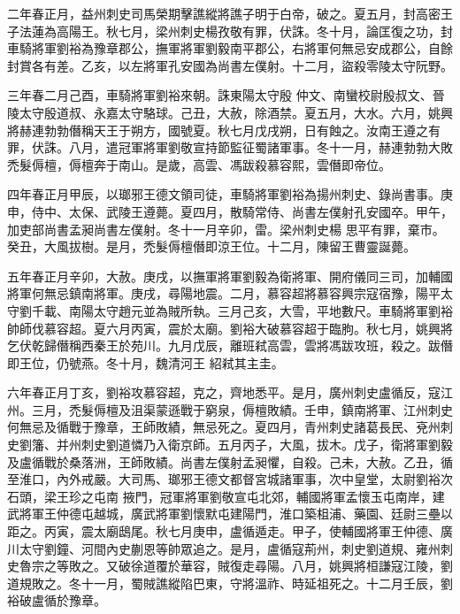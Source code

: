 \begin{pinyinscope}
 二年春正月，益州刺史司馬榮期擊譙縱將譙子明于白帝，破之。夏五月，封高密王子法蓮為高陽王。秋七月，梁州刺史楊孜敬有罪，伏誅。冬十月，論匡復之功，封車騎將軍劉裕為豫章郡公，撫軍將軍劉毅南平郡公，右將軍何無忌安成郡公，自餘封賞各有差。乙亥，以左將軍孔安國為尚書左僕射。十二月，盜殺零陵太守阮野。



 三年春二月己酉，車騎將軍劉裕來朝。誅東陽太守殷
 仲文、南蠻校尉殷叔文、晉陵太守殷道叔、永嘉太守駱球。己丑，大赦，除酒禁。夏五月，大水。六月，姚興將赫連勃勃僭稱天王于朔方，國號夏。秋七月戊戌朔，日有蝕之。汝南王遵之有罪，伏誅。八月，遣冠軍將軍劉敬宣持節監征蜀諸軍事。冬十一月，赫連勃勃大敗禿髮傉檀，傉檀奔于南山。是歲，高雲、馮跋殺慕容熙，雲僭即帝位。



 四年春正月甲辰，以瑯邪王德文領司徒，車騎將軍劉裕為揚州刺史、錄尚書事。庚申，侍中、太保、武陵王遵薨。夏四月，散騎常侍、尚書左僕射孔安國卒。甲午，加吏部尚書孟昶尚書左僕射。冬十一月辛卯，雷。梁州刺史楊
 思平有罪，棄市。癸丑，大風拔樹。是月，禿髮傉檀僭即涼王位。十二月，陳留王曹靈誕薨。



 五年春正月辛卯，大赦。庚戌，以撫軍將軍劉毅為衛將軍、開府儀同三司，加輔國將軍何無忌鎮南將軍。庚戌，尋陽地震。二月，慕容超將慕容興宗寇宿豫，陽平太守劉千載、南陽太守趙元並為賊所執。三月己亥，大雪，平地數尺。車騎將軍劉裕帥師伐慕容超。夏六月丙寅，震於太廟。劉裕大破慕容超于臨朐。秋七月，姚興將乞伏乾歸僭稱西秦王於苑川。九月戊辰，離班弒高雲，雲將馮跋攻班，殺之。跋僭即王位，仍號燕。冬十月，魏清河王
 紹弒其主圭。



 六年春正月丁亥，劉裕攻慕容超，克之，齊地悉平。是月，廣州刺史盧循反，寇江州。三月，禿髮傉檀及沮渠蒙遜戰于窮泉，傉檀敗績。壬申，鎮南將軍、江州刺史何無忌及循戰于豫章，王師敗績，無忌死之。夏四月，青州刺史諸葛長民、兗州刺史劉籓、并州刺史劉道憐乃入衛京師。五月丙子，大風，拔木。戊子，衛將軍劉毅及盧循戰於桑落洲，王師敗績。尚書左僕射孟昶懼，自殺。己未，大赦。乙丑，循至淮口，內外戒嚴。大司馬、瑯邪王德文都督宮城諸軍事，次中皇堂，太尉劉裕次石頭，梁王珍之屯南
 掖門，冠軍將軍劉敬宣屯北郊，輔國將軍孟懷玉屯南岸，建武將軍王仲德屯越城，廣武將軍劉懷默屯建陽門，淮口築柤浦、藥園、廷尉三壘以距之。丙寅，震太廟鴟尾。秋七月庚申，盧循遁走。甲子，使輔國將軍王仲德、廣川太守劉鐘、河間內史蒯恩等帥眾追之。是月，盧循寇荊州，刺史劉道規、雍州刺史魯宗之等敗之。又破徐道覆於華容，賊復走尋陽。八月，姚興將桓謙寇江陵，劉道規敗之。冬十一月，蜀賊譙縱陷巴東，守將溫祚、時延祖死之。十二月壬辰，劉裕破盧循於豫章。




\end{pinyinscope}
